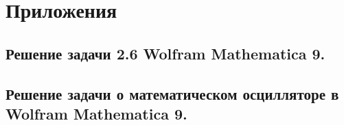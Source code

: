 \documentclass[a4paper,14pt]{article}
\begin{document}

\newpage
\section{Приложения}
\subsection{Решение задачи 2.6 Wolfram Mathematica 9.}
\label{Task1_Wolfram}



\subsection{Решение задачи о математическом осцилляторе в Wolfram Mathematica 9.}
\label{Wolfram}

\end{document}
